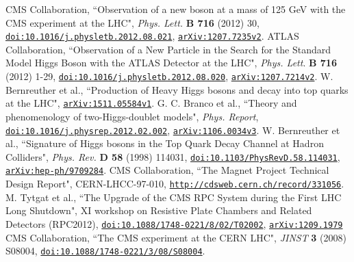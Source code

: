 \documentclass{cmspaper}
\begin{document}
 \begin{thebibliography}{99}
CMS Collaboration, ``Observation of a new boson at a mass of 125 GeV with the CMS experiment at the LHC", \textit{Phys. Lett.} \textbf{B 716} (2012) 30, \href{http://www.sciencedirect.com/science/article/pii/S0370269312008581}{\texttt{doi:10.1016/j.physletb.2012.08.021}}, \href{http://arxiv.org/abs/1207.7235v2}{\texttt{arXiv:1207.7235v2}}.
ATLAS Collaboration, ``Observation of a New Particle in the Search for the Standard Model Higgs Boson with the ATLAS Detector at the LHC", \textit{Phys. Lett}. \textbf{B 716} (2012) 1-29, \href{http://www.sciencedirect.com/science/article/pii/S037026931200857X}{\texttt{doi:10.1016/j.physletb.2012.08.020}}, \href{http://arxiv.org/abs/1207.7214}{\texttt{arXiv:1207.7214v2}}.
W. Bernreuther et al., ``Production of Heavy Higgs bosons and decay into top quarks at the LHC", \href{http://arxiv.org/abs/1511.05584}{\texttt{arXiv:1511.05584v1}}.
G. C. Branco et al., ``Theory and phenomenology of two-Higgs-doublet models", \textit{Phys. Report}, \href{http://www.sciencedirect.com/science/article/pii/S0370157312000695}{\texttt{doi:10.1016/j.physrep.2012.02.002}}, \href{http://arxiv.org/abs/1106.0034}{\texttt{arXiv:1106.0034v3}}.
W. Bernreuther et al., ``Signature of Higgs bosons in the Top Quark Decay Channel at Hadron Colliders", \textit{Phys. Rev.} \textbf{D 58} (1998) 114031, \href{http://journals.aps.org/prd/abstract/10.1103/PhysRevD.58.114031}{\texttt{doi:10.1103/PhysRevD.58.114031}}, \href{http://arxiv.org/pdf/hep-ph/9709284.pdf}{\texttt{arXiv:hep-ph/9709284}}.
CMS Collaboration, ``The Magnet Project Technical Design Report", CERN-LHCC-97-010, \href{http://cdsweb.cern.ch/record/331056}{\texttt{http://cdsweb.cern.ch/record/331056}}.
M. Tytgat et al., ``The Upgrade of the CMS RPC System during the First LHC Long Shutdown", XI workshop on Resistive Plate Chambers and Related Detectors (RPC2012), \href{http://iopscience.iop.org/article/10.1088/1748-0221/8/02/T02002/meta}{\texttt{doi:10.1088/1748-0221/8/02/T02002}}, \href{http://arxiv.org/abs/1209.1979}{\texttt{arXiv:1209.1979}}
CMS Collaboration, ``The CMS experiment at the CERN LHC", \textit{JINST} \textbf{3} (2008) S08004, \href{http://iopscience.iop.org/article/10.1088/1748-0221/3/08/S08004/meta;jsessionid=169D4C0CEE0D0ECD3FAC1D1C8C8B2CB2.c1.iopscience.cld.iop.org}{\texttt{doi:10.1088/1748-0221/3/08/S08004}}.

\end{thebibliography}
\end{document}
